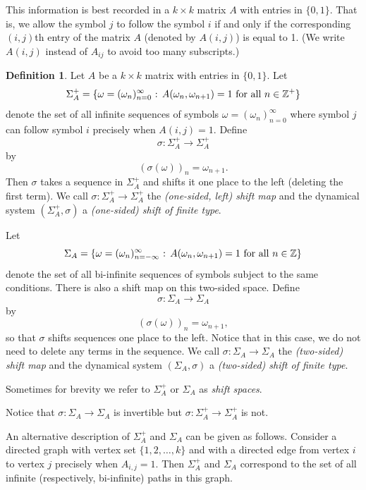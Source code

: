 \documentclass[12pt]{article}
\theoremstyle{definition}
\newtheorem{definition}[theorem]{Definition}
\theoremstyle{remark}
\begin{document}
This information is best recorded in a $k \times k$ matrix $A$ with
entries in $\{0,1\}$.  That is, we allow the symbol $j$ to follow the
symbol $i$ if and only if the corresponding $(i,j)$th entry of the
matrix $A$ (denoted by $A(i,j)$) is equal to 1. (We write $A(i,j)$ instead of $A_{ij}$ to avoid too many subscripts.)

\begin{definition}
Let $A$ be a $k \times k$ matrix with entries in $\{0,1\}$.   Let
\[
 \Sigma_{A}^{+} = \{ \omega =(\omega_{n})_{n=0}^{\infty} \hbox{ : } A(\omega_{n},\omega_{n+1}) =
 1\ \mbox{for all}\ n \in \mathbb Z^+ 
 \}
\]
denote the set of all infinite sequences of symbols $\omega=(\omega_{n})_{n=0}^\infty$ where
symbol $j$ can follow symbol $i$ precisely when $A(i,j)=1$.  
Define
\[
 \sigma  :  \Sigma_{A}^{+} \rightarrow \Sigma_{A}^{+} 
\]
by
\[ 
 (\sigma(\omega))_{n} = \omega_{n+1}.
\]
Then $\sigma$ takes a sequence in $\Sigma_{A}^{+}$ and shifts it one
place to the left (deleting the first term).  We call $\sigma : \Sigma_A^+ \to \Sigma_A^+$ the
{\it  (one-sided, left) shift map} and
the dynamical system
$(\Sigma_{A}^{+},\sigma)$ a {\it  (one-sided) shift of finite type}.

Let 
\[
 \Sigma_{A} = \{\omega= (\omega_{n})_{n=-\infty}^{\infty} \hbox{ : } A(\omega_{n},\omega_{n+1}) =
 1\ \mbox{for all}\ n \in \mathbb Z \}
\]
denote the set of all bi-infinite sequences of symbols subject to the
same conditions.  There is also a shift map on this two-sided space.
Define
\[
 \sigma : \Sigma_{A} \rightarrow \Sigma_{A}
\]
by
\[
 (\sigma(\omega))_{n} = \omega_{n+1},
\]
so that $\sigma$ shifts sequences one place to the left.  Notice that
in this case, we do not need to delete any terms in the sequence.  We
call $\sigma : \Sigma_A \to \Sigma_A$ the {\it  (two-sided) shift map}
and
the dynamical system
$(\Sigma_{A},\sigma)$ a {\it  (two-sided) shift of finite type}.

Sometimes for brevity we refer to $\Sigma_{A}^{+}$ or $\Sigma_{A}$ as
{\it  shift spaces}.
\end{definition}

Notice that $\sigma : \Sigma_A \to \Sigma_A$ is invertible but 
$\sigma : \Sigma_A^+ \to \Sigma_A^+$ is not.  

\medskip


An alternative description of $\Sigma_{A}^{+}$ and $\Sigma_{A}$ can be
given as follows.  Consider a directed graph with vertex set $\{ 1,2, \ldots,
k\}$ and with a directed edge from vertex $i$ to vertex $j$ precisely
when $A_{i,j}=1$.  Then $\Sigma_{A}^{+}$ and $\Sigma_{A}$ correspond
to the set of all infinite (respectively, bi-infinite) paths in this
graph.
\end{document}
